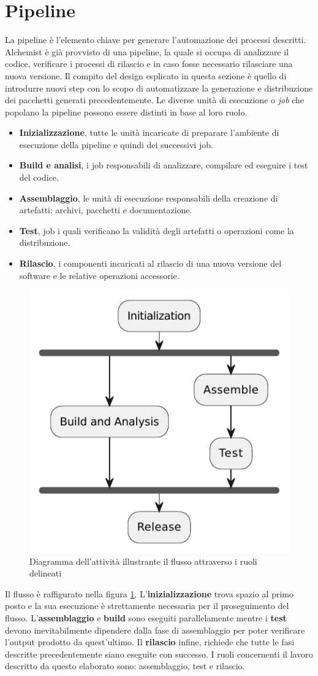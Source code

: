 \section{Pipeline}
La pipeline è l'elemento chiave per generare l'automazione dei processi descritti. Alchemist è già provvisto di una pipeline, la quale si occupa di analizzare il codice, verificare i processi di rilascio e in caso fosse necessario rilasciare una nuova versione. Il compito del design esplicato in questa sezione è quello di introdurre nuovi step con lo scopo di automatizzare la generazione e distribuzione dei pacchetti generati precedentemente. Le diverse unità di esecuzione o \textit{job} che popolano la pipeline possono essere distinti in base al loro ruolo.
\begin{itemize}
	\item \textbf{Inizializzazione}, tutte le unità incaricate di preparare l'ambiente di esecuzione della pipeline e quindi dei successivi job. 
	\item \textbf{Build e analisi}, i job responsabili di analizzare, compilare ed eseguire i test del codice.
	\item \textbf{Assemblaggio}, le unità di esecuzione responsabili della creazione di artefatti: archivi, pacchetti e documentazione.
	\item \textbf{Test}, job i quali verificano la validità degli artefatti o operazioni come la distribuzione.
	\item \textbf{Rilascio}, i componenti incaricati al rilascio di una nuova versione del software e le relative operazioni accessorie.
\end{itemize}
\begin{figure}[htb]
	\centering
	\includegraphics[width=.5\linewidth]{figures/pipeline-roles.pdf}
	\caption{Diagramma dell'attività illustrante il flusso attraverso i ruoli delineati}
	\label{fig:workflow-roles-summary}
\end{figure}
Il flusso è raffigurato nella figura \ref{fig:workflow-roles-summary}. L'\textbf{inizializzazione} trova spazio al primo posto e la sua esecuzione è strettamente necessaria per il proseguimento del flusso. L'\textbf{assemblaggio} e \textbf{build} sono eseguiti parallelamente mentre i \textbf{test} devono inevitabilmente dipendere dalla fase di assemblaggio per poter verificare l'output prodotto da quest'ultimo. Il \textbf{rilascio} infine, richiede che tutte le fasi descritte precedentemente siano eseguite con successo. I ruoli concernenti il lavoro descritto da questo elaborato sono: assemblaggio, test e rilascio.

